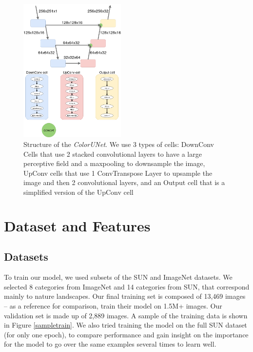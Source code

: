 \documentclass[10pt,twocolumn,letterpaper]{article}
\begin{document}
\begin{figure}
\begin{center}
\includegraphics[width=200px]{diagram}
\caption{Structure of the \textit{ColorUNet}. We use 3 types of cells: DownConv Cells that use 2 stacked convolutional layers to have a large perceptive field and a maxpooling to downsample the image, UpConv cells that use 1 ConvTranspose Layer to upsample the image and then 2 convolutional layers, and an Output cell that is a simplified version of the UpConv cell}
\label{structure}
\end{center}
\end{figure}

\section{Dataset and Features}

\subsection{Datasets}
To train our model, we used subsets of the SUN \cite{xiao2010sun} and ImageNet \cite{russakovsky2015imagenet} datasets. We selected 8 categories from ImageNet and 14 categories from SUN, that correspond mainly to nature landscapes. Our final training set is composed of 13,469 images -- as a reference for comparison, \cite{zhang2016colorful} train their model on 1.5M+ images. Our validation set is made up of 2,889 images. A sample of the training data is shown in Figure \ref{sampletrain}.
We also tried training the model on the full SUN dataset (for only one epoch), to compare performance and gain insight on the importance for the model to go over the same examples several times to learn well.
\end{document}
